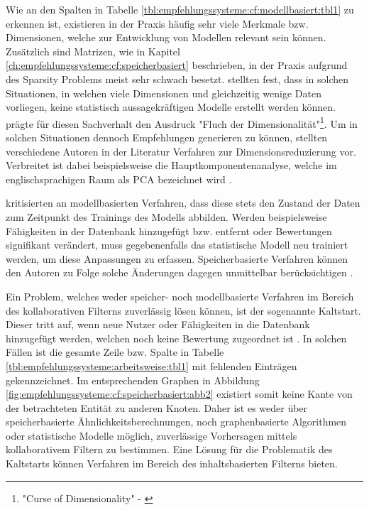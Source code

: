 Wie an den Spalten in Tabelle \ref{tbl:empfehlungssysteme:cf:modellbasiert:tbl1} zu erkennen ist, existieren in der Praxis häufig sehr viele Merkmale bzw. Dimensionen, welche zur Entwicklung von Modellen relevant sein können. Zusätzlich sind Matrizen, wie in Kapitel \ref{ch:empfehlungssysteme:cf:speicherbasiert} beschrieben, in der Praxis aufgrund des Sparsity Problems meist sehr schwach besetzt. \textcite[S. 1]{boratto:2014} stellten fest, dass in solchen Situationen, in welchen viele Dimensionen und gleichzeitig wenige Daten vorliegen, keine statistisch aussagekräftigen Modelle erstellt werden können. \textcite[S. 94, Z. 7]{bellman:1961} prägte für diesen Sachverhalt den Ausdruck "Fluch der Dimensionalität"\footnote{"Curse of Dimensionality" - \textcite[S. 94, Z. 7]{bellman:1961}}. Um in solchen Situationen dennoch Empfehlungen generieren zu können, stellten verschiedene Autoren in der Literatur Verfahren zur Dimensionsreduzierung vor. Verbreitet ist dabei beispielsweise die Hauptkomponentenanalyse, welche im englischsprachigen Raum als \ac{PCA} bezeichnet wird \cite[S. 1ff.]{vaswani:2018}.

\textcite[S. 1f.]{pennock:2000} kritisierten an modellbasierten Verfahren, dass diese stets den Zustand der Daten zum Zeitpunkt des Trainings des Modells abbilden. Werden beispielsweise Fähigkeiten in der Datenbank hinzugefügt bzw. entfernt oder Bewertungen signifikant verändert, muss gegebenenfalls das statistische Modell neu trainiert werden, um diese Anpassungen zu erfassen. Speicherbasierte Verfahren können den Autoren zu Folge solche Änderungen dagegen unmittelbar berücksichtigen \cite[S. 1f.]{pennock:2000}.

Ein Problem, welches weder speicher- noch modellbasierte Verfahren im Bereich des kollaborativen Filterns zuverlässig lösen können, ist der sogenannte Kaltstart. Dieser tritt auf, wenn neue Nutzer oder Fähigkeiten in die Datenbank hinzugefügt werden, welchen noch keine Bewertung zugeordnet ist \cite[S. 5]{huang:2004}. In solchen Fällen ist die gesamte Zeile bzw. Spalte in Tabelle \ref{tbl:empfehlungssysteme:arbeitsweise:tbl1} mit fehlenden Einträgen gekennzeichnet. Im entsprechenden Graphen in Abbildung \ref{fig:empfehlungssysteme:cf:speicherbasiert:abb2} existiert somit keine Kante von der betrachteten Entität zu anderen Knoten. Daher ist es weder über speicherbasierte Ähnlichkeitsberechnungen, noch graphenbasierte Algorithmen oder statistische Modelle möglich, zuverlässige Vorhersagen mittels kollaborativem Filtern zu bestimmen. Eine Lösung für die Problematik des Kaltstarts können Verfahren im Bereich des inhaltsbasierten Filterns bieten. %


